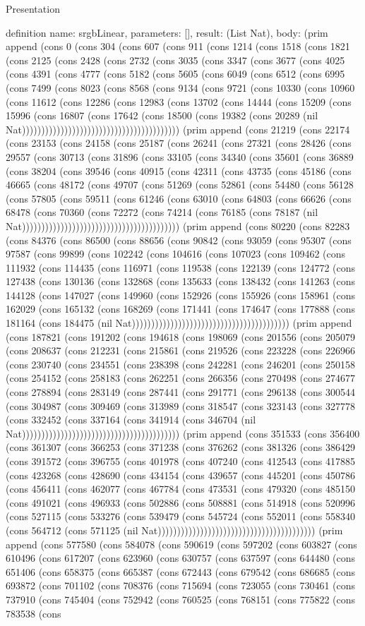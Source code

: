 \begin{lexlean}{Presentation}
\begin{semanticmodule}
definition{
  name: srgbLinear,
  parameters: [],
  result: (List Nat),
  body: (prim append (cons 0 (cons 304 (cons 607 (cons 911 (cons 1214 (cons 1518 (cons 1821 (cons 2125 (cons 2428 (cons 2732 (cons 3035 (cons 3347 (cons 3677 (cons 4025 (cons 4391 (cons 4777 (cons 5182 (cons 5605 (cons 6049 (cons 6512 (cons 6995 (cons 7499 (cons 8023 (cons 8568 (cons 9134 (cons 9721 (cons 10330 (cons 10960 (cons 11612 (cons 12286 (cons 12983 (cons 13702 (cons 14444 (cons 15209 (cons 15996 (cons 16807 (cons 17642 (cons 18500 (cons 19382 (cons 20289 (nil Nat))))))))))))))))))))))))))))))))))))))))) (prim append (cons 21219 (cons 22174 (cons 23153 (cons 24158 (cons 25187 (cons 26241 (cons 27321 (cons 28426 (cons 29557 (cons 30713 (cons 31896 (cons 33105 (cons 34340 (cons 35601 (cons 36889 (cons 38204 (cons 39546 (cons 40915 (cons 42311 (cons 43735 (cons 45186 (cons 46665 (cons 48172 (cons 49707 (cons 51269 (cons 52861 (cons 54480 (cons 56128 (cons 57805 (cons 59511 (cons 61246 (cons 63010 (cons 64803 (cons 66626 (cons 68478 (cons 70360 (cons 72272 (cons 74214 (cons 76185 (cons 78187 (nil Nat))))))))))))))))))))))))))))))))))))))))) (prim append (cons 80220 (cons 82283 (cons 84376 (cons 86500 (cons 88656 (cons 90842 (cons 93059 (cons 95307 (cons 97587 (cons 99899 (cons 102242 (cons 104616 (cons 107023 (cons 109462 (cons 111932 (cons 114435 (cons 116971 (cons 119538 (cons 122139 (cons 124772 (cons 127438 (cons 130136 (cons 132868 (cons 135633 (cons 138432 (cons 141263 (cons 144128 (cons 147027 (cons 149960 (cons 152926 (cons 155926 (cons 158961 (cons 162029 (cons 165132 (cons 168269 (cons 171441 (cons 174647 (cons 177888 (cons 181164 (cons 184475 (nil Nat))))))))))))))))))))))))))))))))))))))))) (prim append (cons 187821 (cons 191202 (cons 194618 (cons 198069 (cons 201556 (cons 205079 (cons 208637 (cons 212231 (cons 215861 (cons 219526 (cons 223228 (cons 226966 (cons 230740 (cons 234551 (cons 238398 (cons 242281 (cons 246201 (cons 250158 (cons 254152 (cons 258183 (cons 262251 (cons 266356 (cons 270498 (cons 274677 (cons 278894 (cons 283149 (cons 287441 (cons 291771 (cons 296138 (cons 300544 (cons 304987 (cons 309469 (cons 313989 (cons 318547 (cons 323143 (cons 327778 (cons 332452 (cons 337164 (cons 341914 (cons 346704 (nil Nat))))))))))))))))))))))))))))))))))))))))) (prim append (cons 351533 (cons 356400 (cons 361307 (cons 366253 (cons 371238 (cons 376262 (cons 381326 (cons 386429 (cons 391572 (cons 396755 (cons 401978 (cons 407240 (cons 412543 (cons 417885 (cons 423268 (cons 428690 (cons 434154 (cons 439657 (cons 445201 (cons 450786 (cons 456411 (cons 462077 (cons 467784 (cons 473531 (cons 479320 (cons 485150 (cons 491021 (cons 496933 (cons 502886 (cons 508881 (cons 514918 (cons 520996 (cons 527115 (cons 533276 (cons 539479 (cons 545724 (cons 552011 (cons 558340 (cons 564712 (cons 571125 (nil Nat))))))))))))))))))))))))))))))))))))))))) (prim append (cons 577580 (cons 584078 (cons 590619 (cons 597202 (cons 603827 (cons 610496 (cons 617207 (cons 623960 (cons 630757 (cons 637597 (cons 644480 (cons 651406 (cons 658375 (cons 665387 (cons 672443 (cons 679542 (cons 686685 (cons 693872 (cons 701102 (cons 708376 (cons 715694 (cons 723055 (cons 730461 (cons 737910 (cons 745404 (cons 752942 (cons 760525 (cons 768151 (cons 775822 (cons 783538 (cons }
\end{semanticmodule}
\end{lexlean}
